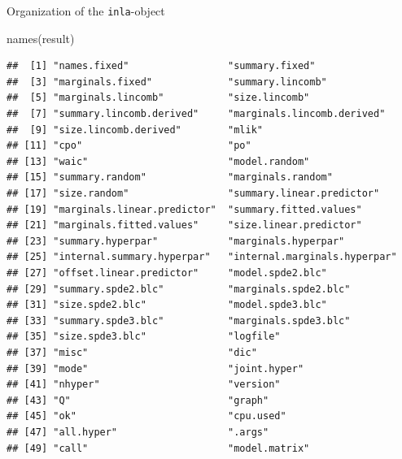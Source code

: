 \documentclass[
  ignorenonframetext,
]{beamer}
\newenvironment{Shaded}{\begin{snugshade}}{\end{snugshade}}
\newcommand{\FunctionTok}[1]{\textcolor[rgb]{0.00,0.00,0.00}{#1}}
\newcommand{\NormalTok}[1]{#1}
\begin{document}
\begin{frame}[fragile]{Organization of the \texttt{inla}-object}
\protect\hypertarget{organization-of-the-inla-object}{}
\tiny

\begin{Shaded}
\begin{Highlighting}[]
\FunctionTok{names}\NormalTok{(result)}
\end{Highlighting}
\end{Shaded}

\begin{verbatim}
##  [1] "names.fixed"                 "summary.fixed"              
##  [3] "marginals.fixed"             "summary.lincomb"            
##  [5] "marginals.lincomb"           "size.lincomb"               
##  [7] "summary.lincomb.derived"     "marginals.lincomb.derived"  
##  [9] "size.lincomb.derived"        "mlik"                       
## [11] "cpo"                         "po"                         
## [13] "waic"                        "model.random"               
## [15] "summary.random"              "marginals.random"           
## [17] "size.random"                 "summary.linear.predictor"   
## [19] "marginals.linear.predictor"  "summary.fitted.values"      
## [21] "marginals.fitted.values"     "size.linear.predictor"      
## [23] "summary.hyperpar"            "marginals.hyperpar"         
## [25] "internal.summary.hyperpar"   "internal.marginals.hyperpar"
## [27] "offset.linear.predictor"     "model.spde2.blc"            
## [29] "summary.spde2.blc"           "marginals.spde2.blc"        
## [31] "size.spde2.blc"              "model.spde3.blc"            
## [33] "summary.spde3.blc"           "marginals.spde3.blc"        
## [35] "size.spde3.blc"              "logfile"                    
## [37] "misc"                        "dic"                        
## [39] "mode"                        "joint.hyper"                
## [41] "nhyper"                      "version"                    
## [43] "Q"                           "graph"                      
## [45] "ok"                          "cpu.used"                   
## [47] "all.hyper"                   ".args"                      
## [49] "call"                        "model.matrix"
\end{verbatim}

\normalsize
\end{frame}
\end{document}
